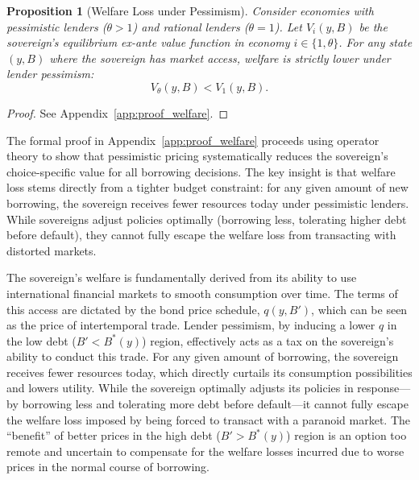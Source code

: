 \documentclass[12pt]{article}
\theoremstyle{plain}
\newtheorem{proposition}{Proposition}
\begin{document}
\begin{proposition}[Welfare Loss under Pessimism]
	\label{prop:welfare}
	Consider economies with pessimistic lenders ($\theta > 1$) and rational lenders ($\theta = 1$). Let $V_i(y, B)$ be the sovereign's equilibrium ex-ante value function in economy $i \in \{1, \theta\}$. For any state $(y, B)$ where the sovereign has market access, welfare is strictly lower under lender pessimism:
	\begin{equation*}
		V_\theta(y, B) < V_1(y, B).
	\end{equation*}
\end{proposition}

\begin{proof}
	See Appendix~\ref{app:proof_welfare}.
\end{proof}
The formal proof in Appendix~\ref{app:proof_welfare} proceeds using operator theory to show that pessimistic pricing systematically reduces the sovereign's choice-specific value for all borrowing decisions. The key insight is that welfare loss stems directly from a tighter budget constraint: for any given amount of new borrowing, the sovereign receives fewer resources today under pessimistic lenders. While sovereigns adjust policies optimally (borrowing less, tolerating higher debt before default), they cannot fully escape the welfare loss from transacting with distorted markets.

The sovereign's welfare is fundamentally derived from its ability to use
international financial markets to smooth consumption over time. The terms of
this access are dictated by the bond price schedule, $q(y,B')$, which can be
seen as the price of intertemporal trade. Lender pessimism, by inducing a lower
$q$ in the low debt ($B' < B^*(y)$) region, effectively acts as a tax on the
sovereign's ability to conduct this trade. For any given amount of borrowing,
the sovereign receives fewer resources today, which directly curtails its
consumption possibilities and lowers utility. While the sovereign optimally
adjusts its policies in response—by borrowing less and tolerating more debt
before default—it cannot fully escape the welfare loss imposed by being forced
to transact with a paranoid market. The ``benefit'' of better prices in the
high debt ($B' > B^*(y)$) region is an option too remote and uncertain to
compensate for the welfare losses incurred due to worse prices in the normal
course of borrowing.
\end{document}
